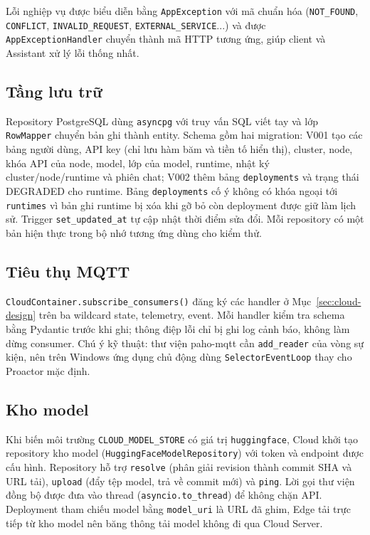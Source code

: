 Lỗi nghiệp vụ được biểu diễn bằng \texttt{AppException} với mã chuẩn hóa
(\texttt{NOT\_FOUND}, \texttt{CONFLICT}, \texttt{INVALID\_REQUEST},
\texttt{EXTERNAL\_SERVICE}...) và được \texttt{AppExceptionHandler} chuyển thành
mã HTTP tương ứng, giúp client và Assistant xử lý lỗi thống nhất.

\subsection{Tầng lưu trữ}

Repository PostgreSQL dùng \texttt{asyncpg} với truy vấn SQL viết tay và lớp
\texttt{RowMapper} chuyển bản ghi thành entity. Schema gồm hai migration: V001
tạo các bảng người dùng, API key (chỉ lưu hàm băm và tiền tố hiển thị), cluster,
node, khóa API của node, model, lớp của model, runtime, nhật ký cluster/node/runtime
và phiên chat; V002 thêm bảng \texttt{deployments} và trạng thái DEGRADED cho
runtime. Bảng \texttt{deployments} cố ý không có khóa ngoại tới \texttt{runtimes}
vì bản ghi runtime bị xóa khi gỡ bỏ còn deployment được giữ làm lịch sử. Trigger
\texttt{set\_updated\_at} tự cập nhật thời điểm sửa đổi. Mỗi repository có một bản
hiện thực trong bộ nhớ tương ứng dùng cho kiểm thử.

\subsection{Tiêu thụ MQTT}

\texttt{CloudContainer.subscribe\_consumers()} đăng ký các handler ở
Mục~\ref{sec:cloud-design} trên ba wildcard state, telemetry, event. Mỗi
handler kiểm tra schema bằng Pydantic trước khi ghi; thông điệp lỗi chỉ bị ghi
log cảnh báo, không làm dừng consumer. Chú ý kỹ thuật: thư viện paho-mqtt cần
\texttt{add\_reader} của vòng sự kiện, nên trên Windows ứng dụng chủ động dùng
\texttt{SelectorEventLoop} thay cho Proactor mặc định.

\subsection{Kho model}

Khi biến môi trường \texttt{CLOUD\_MODEL\_STORE} có giá trị
\texttt{huggingface}, Cloud khởi tạo repository kho model
(\texttt{HuggingFaceModelRepository}) với token và endpoint được cấu hình. Repository hỗ
trợ \texttt{resolve} (phân giải revision thành commit SHA và URL tải), \texttt{upload}
(đẩy tệp model, trả về commit mới) và \texttt{ping}. Lời gọi thư viện đồng bộ được
đưa vào thread (\texttt{asyncio.to\_thread}) để không chặn API. Deployment tham
chiếu model bằng \texttt{model\_uri} là URL đã ghim, Edge tải trực tiếp từ kho model
nên băng thông tải model không đi qua Cloud Server.
